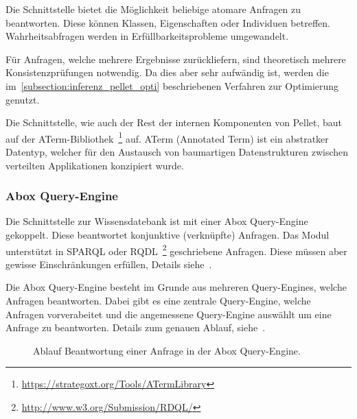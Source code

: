 Die Schnittstelle bietet die Möglichkeit beliebige atomare Anfragen zu beantworten. Diese können Klassen, Eigenschaften oder Individuen betreffen. Wahrheitsabfragen werden in Erfüllbarkeitsprobleme umgewandelt.

Für Anfragen, welche mehrere Ergebnisse zurückliefern, sind theoretisch mehrere Konsistenzprüfungen notwendig. Da dies aber sehr aufwändig ist, werden die im~\autoref{subsection:inferenz_pellet_opti} beschriebenen Verfahren zur Optimierung genutzt.

Die Schnittstelle, wie auch der Rest der internen Komponenten von Pellet, baut auf der ATerm-Bibliothek~\footnote{\url{https://strategoxt.org/Tools/ATermLibrary}} auf. ATerm (Annotated Term) ist ein abstratker Datentyp, welcher für den Austausch von baumartigen Datenstrukturen zwischen verteilten Applikationen konzipiert wurde.

\subsubsection{Abox Query-Engine}
\label{ssubsection:inferenz_pellet_aboxquery}
Die Schnittstelle zur Wissensdatebank ist mit einer Abox Query-Engine gekoppelt. Diese beantwortet konjunktive (verknüpfte) Anfragen. Das Modul unterstützt in SPARQL oder RQDL~\footnote{\url{http://www.w3.org/Submission/RDQL/}} geschriebene Anfragen. Diese müssen aber gewisse Einschränkungen erfüllen, Details siehe~\cite[Seiten 10 und 11]{sirin:pellet05}.

Die Abox Query-Engine besteht im Grunde aus mehreren Query-Engines, welche Anfragen beantworten. Dabei gibt es eine zentrale Query-Engine, welche Anfragen vorverabeitet und die angemessene Query-Engine auswählt um eine Anfrage zu beantworten. Details zum genauen Ablauf, siehe~\cite[Seite 11]{sirin:pellet05}.

\begin{figure}[htbp]
    \centering {}
    \caption{Ablauf Beantwortung einer Anfrage in der Abox Query-Engine.\label{fig:pellet_queryengine_komponenten}\protect\footnotemark}
\end{figure}


